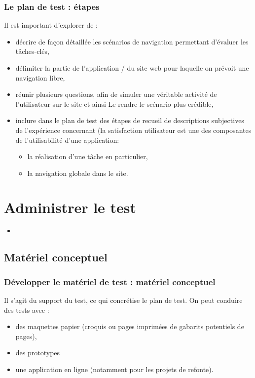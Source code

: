 		\begin{frame}[allowframebreaks]
			\frametitle{Le plan de test : étapes}
			Il est important d'explorer de :
			\begin {itemize}
				      \item décrire de façon détaillée les scénarios de navigation permettant d'évaluer les tâches-clés,
				      \item délimiter la partie de l'application / du site web pour laquelle on prévoit une navigation libre,
				      \item réunir plusieurs questions, afin de simuler une véritable activité de l'utilisateur sur le site et ainsi Le rendre le scénario plus crédible,
				      \item inclure dans le plan de test des étapes de recueil de descriptions subjectives de l'expérience concernant (la satisfaction utilisateur est une des composantes de l'utilisabilité d'une application:
				      \begin {itemize}
				     		\item la réalisation d'une tâche en particulier,
				      		\item la navigation globale dans le site.
				      	\end{itemize}
			\end{itemize}
		\end{frame}
		
	

		       
	
	\section{Administrer le test} 
		\begin{frame}[allowframebreaks]
			\begin {itemize}
				      \item 
			\end{itemize}
		\end{frame}        
		
	\subsection{Matériel conceptuel } 
		
		\begin{frame}[allowframebreaks]
		\frametitle{Développer le matériel de test : matériel conceptuel}
		 Il s'agit du support du test, ce qui concrétise le plan de test.
		 On peut conduire des tests avec :
			\begin {itemize}
				      \item des maquettes papier (croquis ou pages imprimées de gabarits potentiels de pages), 
				      \item des prototypes
				      \item une application en ligne (notamment pour les projets de refonte). 
				   
			\end{itemize}
		\end{frame}   	
		
